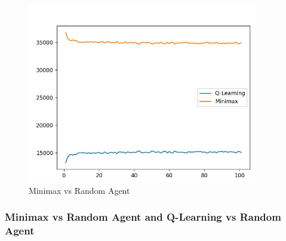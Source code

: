 \documentclass{article}
\begin{document}
\begin{figure}[htbp]
    \centering
    \includegraphics[width=0.9\textwidth]{img 4.jpg}
    \caption{Minimax vs Random Agent}
    \label{fig:example}
\end{figure}


\subsubsection{Minimax vs Random Agent and  Q-Learning vs Random Agent}
\end{document}
